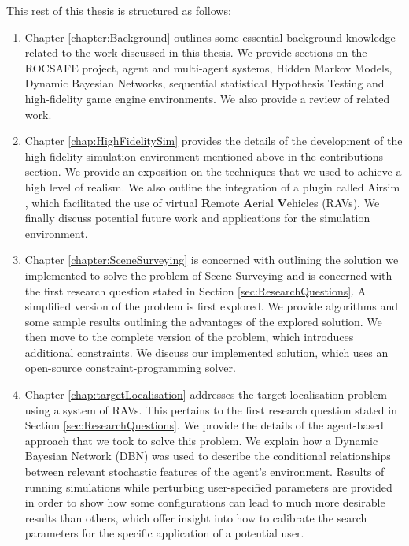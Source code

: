 This rest of this thesis is structured as follows: 
\begin{enumerate}
    \item Chapter \ref{chapter:Background} outlines some essential background knowledge related to the work discussed in this thesis. We provide sections on the ROCSAFE project, agent and multi-agent systems, Hidden Markov Models, Dynamic Bayesian Networks, sequential statistical Hypothesis Testing and high-fidelity game engine environments. We also provide a review of related work.
    
    \item Chapter \ref{chap:HighFidelitySim} provides the details of the development of the high-fidelity simulation environment mentioned above in the contributions section. We provide an exposition on the techniques that we used to achieve a high level of realism. We also outline the integration of a plugin called Airsim \cite{Shah2017AirSim:Vehicles}, which facilitated the use of virtual \textbf{R}emote \textbf{A}erial \textbf{V}ehicles (RAVs). We finally discuss potential future work and applications for the simulation environment.
    
    \item Chapter \ref{chapter:SceneSurveying} is concerned with outlining the solution we implemented to solve the problem of Scene Surveying and is concerned with the first research question stated in Section \ref{sec:ResearchQuestions}. A simplified version of the problem is first explored. We provide algorithms and some sample results outlining the advantages of the explored solution. We then move to the complete version of the problem, which introduces additional constraints. We discuss our implemented solution, which uses an open-source constraint-programming solver.
    
    \item Chapter \ref{chap:targetLocalisation} addresses the target localisation problem using a system of RAVs. This pertains to the first  research question stated in Section \ref{sec:ResearchQuestions}. We provide the details of the agent-based approach that we took to solve this problem. We explain how a Dynamic Bayesian Network (DBN) was used to describe the conditional relationships between relevant stochastic features of the agent's environment. Results of running simulations while perturbing user-specified parameters are provided in order to show how some configurations can lead to much more desirable results than others, which offer insight into how to calibrate the search parameters for the specific application of a potential user.
    
\end{enumerate}